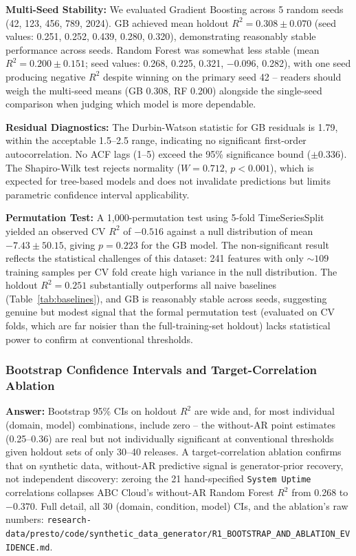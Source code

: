 \documentclass[technologies,article,submit,pdftex,moreauthors]{Definitions/mdpi}
\begin{document}
\textbf{Multi-Seed Stability:} We evaluated Gradient Boosting across 5
random seeds (42, 123, 456, 789, 2024). GB achieved mean holdout
\(R^2 = 0.308 \pm 0.070\) (seed values: 0.251, 0.252, 0.439, 0.280,
0.320), demonstrating reasonably stable performance across seeds. Random
Forest was somewhat less stable (mean \(R^2 = 0.200 \pm 0.151\); seed
values: 0.268, 0.225, 0.321, \(-0.096\), 0.282), with one seed producing
negative \(R^2\) despite winning on the primary seed 42 -- readers
should weigh the multi-seed means (GB 0.308, RF 0.200) alongside the
single-seed comparison when judging which model is more dependable.

\textbf{Residual Diagnostics:} The Durbin-Watson statistic for GB
residuals is 1.79, within the acceptable 1.5--2.5 range, indicating no
significant first-order autocorrelation. No ACF lags (1--5) exceed the
95\% significance bound (\(\pm 0.336\)). The Shapiro-Wilk test rejects
normality (\(W=0.712\), \(p < 0.001\)), which is expected for tree-based
models and does not invalidate predictions but limits parametric
confidence interval applicability.

\textbf{Permutation Test:} A 1,000-permutation test using 5-fold
TimeSeriesSplit yielded an observed CV \(R^2\) of \(-0.516\) against a
null distribution of mean \(-7.43 \pm 50.15\), giving \(p = 0.223\) for
the GB model. The non-significant result reflects the statistical
challenges of this dataset: 241 features with only \(\sim 109\) training
samples per CV fold create high variance in the null distribution. The
holdout \(R^2 = 0.251\) substantially outperforms all naive baselines
(Table~\ref{tab:baselines}), and GB is reasonably stable across seeds,
suggesting genuine but modest signal that the formal permutation test
(evaluated on CV folds, which are far noisier than the full-training-set
holdout) lacks statistical power to confirm at conventional thresholds.

\subsubsection{Bootstrap Confidence Intervals and Target-Correlation
Ablation}\label{sec:bootstrap_ablation}

\textbf{Answer:} Bootstrap 95\% CIs on holdout \(R^2\) are wide and, for
most individual (domain, model) combinations, include zero -- the
without-AR point estimates (0.25--0.36) are real but not individually
significant at conventional thresholds given holdout sets of only 30--40
releases. A target-correlation ablation confirms that on synthetic data,
without-AR predictive signal is generator-prior recovery, not
independent discovery: zeroing the 21 hand-specified
\texttt{System\ Uptime} correlations collapses ABC Cloud's without-AR
Random Forest \(R^2\) from 0.268 to \(-0.370\). Full detail, all 30
(domain, condition, model) CIs, and the ablation's raw numbers:
\texttt{research-data/\allowbreak presto/\allowbreak code/\allowbreak synthetic\_\allowbreak data\_\allowbreak generator/\allowbreak R1\_\allowbreak BOOTSTRAP\_\allowbreak AND\_\allowbreak ABLATION\_\allowbreak EVIDENCE.md}.
\end{document}
